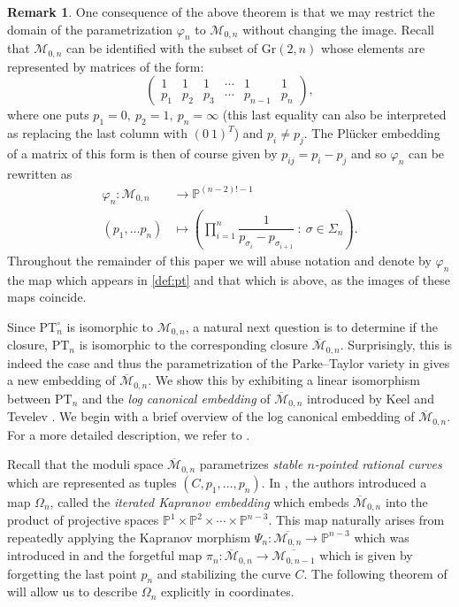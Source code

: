 \documentclass[12pt, reqno]{amsart}
\numberwithin{equation}{section}
\theoremstyle{plain}
\theoremstyle{definition}
\newtheorem{remark}[theorem]{Remark}
\newcommand{\pp}{\mathbb{P}}
\newcommand{\cm}{\mathcal{M}}
\newcommand{\monbar}{\overline{\mathcal{M}}_{0, n}}
\newcommand{\pt}{\mathrm{PT}}
\newcommand{\gr}{\mathrm{Gr}}
\begin{document}
\begin{remark}
\label{rem:restrict-to-m0n}
One consequence of the above theorem is that we may restrict the domain of the parametrization $\varphi_n$ to $\cm_{0, n}$ without changing the image. Recall that $\cm_{0, n}$ can be identified with the subset of $\gr(2, n)$ whose elements are represented by matrices of the form:
\[
\begin{pmatrix}
    1 & 1 & 1 & \cdots & 1 & 1\\
    p_1 & p_2 & p_3 & \cdots &p_{n-1} &p_n
\end{pmatrix},
\]
where one puts $p_1=0,\ p_2=1,\ p_n=\infty$ (this last equality can also be interpreted as replacing the last column with $(0\ 1)^T$) and $p_i\neq p_j$.
The Pl\"ucker embedding of a matrix of this form is then of course given by $p_{ij} = p_i - p_j$ and so $\varphi_n$ can be rewritten as
\begin{align*}
\varphi_n: \cm_{0, n} &\to \pp^{(n-2)! - 1} \\
            (p_1, \ldots p_n) &\mapsto \left(  \prod_{i=1}^n \dfrac{1}{p_{\sigma_i} - p_{\sigma_{i+1}}}  ~:~ \sigma \in \Sigma_n \right).
\end{align*}
Throughout the remainder of this paper we will abuse notation and denote by $\varphi_n$ the map which appears in \cref{def:pt} and that which is above, as the images of these maps coincide. 
\end{remark}


Since $\mathrm{PT}_n^\circ$ is isomorphic to $\cm_{0, n}$, a natural next question is to determine if the closure, $\pt_n$ is isomorphic to the corresponding closure $\monbar$. Surprisingly, this is indeed the case and thus the parametrization of the Parke--Taylor variety in  gives a new embedding of $\monbar$. We show this by exhibiting a linear isomorphism between $\pt_n$ and the \emph{log canonical embedding} of $\monbar$ introduced by Keel and Tevelev \cite{keel2009equations}. We begin with a brief overview of the log canonical embedding of $\monbar$. For a more detailed description, we refer to \cite{keel2009equations, monin2017equations}. 


Recall that the moduli space $\monbar$ parametrizes \emph{stable $n$-pointed rational curves} which are represented as tuples $(C, p_1, \ldots, p_n)$. In \cite{keel2009equations}, the authors introduced a map $\Omega_n$, called the \emph{iterated Kapranov embedding} which embeds $\monbar$ into the product of projective spaces $\pp^1 \times \pp^2 \times \cdots \times \pp^{n-3}$. This map naturally arises from repeatedly applying the Kapranov morphism $\Psi_n: \overline{\cm_{0, n}} \to \pp^{n-3}$ which was introduced in \cite{kapranov1993veronese} and the forgetful map $\pi_n: \monbar \to \overline{\cm_{0, n-1}}$ which is given by forgetting the last point $p_n$ and stabilizing the curve $C$. The following theorem of \cite{keel2009equations} will allow us to describe $\Omega_n$ explicitly in coordinates. 
\end{document}
